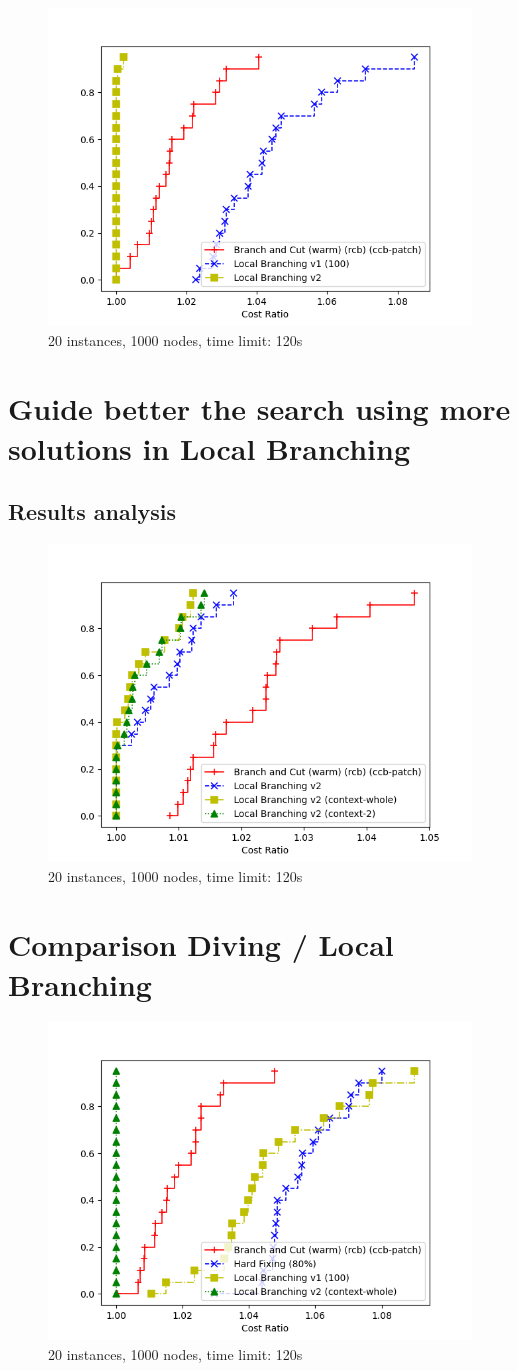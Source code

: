 \begin{figure}[h]
    \centering
    \includegraphics*[width=.6\textwidth]{../plots/perfprof_lb_costs.png}
    \caption*{20 instances, 1000 nodes, time limit: 120s}
\end{figure}

\newpage

\section{Guide better the search using more solutions in Local Branching}

\subsection{Results analysis}
\begin{figure}[h]
    \centering
    \includegraphics*[width=.6\textwidth]{../plots/perfprof_lbv2_costs.png}
    \caption*{20 instances, 1000 nodes, time limit: 120s}
\end{figure}

\newpage

\section{Comparison Diving / Local Branching}

\begin{figure}[h]
    \centering
    \includegraphics*[width=.6\textwidth]{../plots/perfprof_mat_costs_result.png}
    \caption*{20 instances, 1000 nodes, time limit: 120s}
\end{figure}